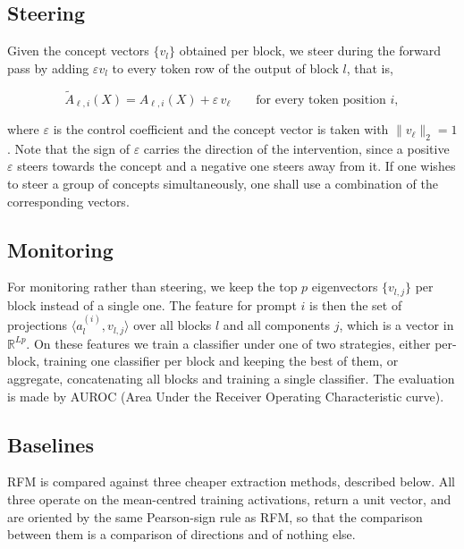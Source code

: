 \subsection{Steering}

Given the concept vectors $\{v_l\}$ obtained per block, we steer during the forward pass
by adding $\varepsilon v_l$ to every token row of the output of block $l$, that is,

\[
  \tilde{A}_{\ell,i}(X) = A_{\ell,i}(X) + \varepsilon\, v_\ell
  \qquad \text{for every token position } i,
\]

where $\varepsilon$ is the control coefficient and the concept vector is taken with
$\|v_\ell\|_2 = 1$. Note that the sign of $\varepsilon$ carries the direction of the
intervention, since a positive $\varepsilon$ steers towards the concept and a negative one
steers away from it. If one wishes to steer a group of concepts simultaneously, one shall
use a combination of the corresponding vectors.

\subsection{Monitoring}

For monitoring rather than steering, we keep the top $p$ eigenvectors $\{v_{l,j}\}$ per
block instead of a single one. The feature for prompt $i$ is then the set of projections
$\langle a_l^{(i)}, v_{l,j} \rangle$ over all blocks $l$ and all components $j$, which is
a vector in $\mathbb{R}^{Lp}$. On these features we train a classifier under one of two
strategies, either per-block, training one classifier per block and keeping the best of
them, or aggregate, concatenating all blocks and training a single classifier. The
evaluation is made by AUROC (Area Under the Receiver Operating Characteristic curve).

\subsection{Baselines}

RFM is compared against three cheaper extraction methods, described below. All three
operate on the mean-centred training activations, return a unit vector, and are oriented
by the same Pearson-sign rule as RFM, so that the comparison between them is a comparison
of directions and of nothing else.

